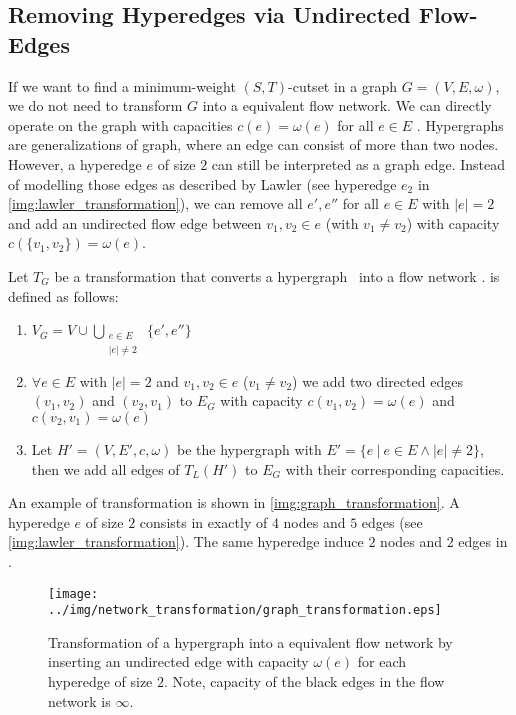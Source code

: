 \subsection{Removing Hyperedges via Undirected Flow-Edges}
\label{sec:edge_size_network}

If we want to find a minimum-weight $(S,T)$-cutset in a graph $G = (V,E,\omega)$, we do not need to transform
$G$ into a equivalent flow network. We can directly operate on the graph with capacities
$c(e) = \omega(e)$ for all $e \in E$ \cite{ford1956maximal}. Hypergraphs are generalizations of graph, where
an edge can consist of more than two nodes. However, a hyperedge $e$ of size $2$ can still be 
interpreted as a graph edge. Instead of modelling those edges as described by Lawler \cite{lawler1973}
(see hyperedge $e_2$ in \autoref{img:lawler_transformation}), we can remove all $e',e''$ for all $e \in E$
with $|e| = 2$ and add an undirected flow edge between $v_1,v_2 \in e$ (with $v_1 \neq v_2$) with
capacity $c(\{v_1,v_2\}) = \omega(e)$.

\begin{definition}
Let $T_G$ be a transformation that converts a hypergraph \HypergraphDef~into 
a flow network .  is defined as follows:
\begin{enumerate}
\item $V_G = V \cup \bigcup\limits_{\substack{e \in E \\ |e| \neq 2}}\ \{e', e''\}$
\item $\forall e \in E$ with $|e| = 2$ and $v_1,v_2 \in e$ ($v_1 \neq v_2$) we add 
      two directed edges $(v_1,v_2)$ and $(v_2,v_1)$ to $E_G$ with capacity $c(v_1,v_2) = \omega(e)$
      and $c(v_2,v_1) = \omega(e)$
\item Let $H' = (V,E',c,\omega)$ be the hypergraph with $E' = \{e\ |\ e \in E \land |e| \neq 2\}$,
      then we add all edges of $T_L(H')$ to $E_G$ with their corresponding capacities.
\end{enumerate} 
\end{definition}

An example of transformation  is shown in \autoref{img:graph_transformation}. A hyperedge
$e$ of size $2$ consists in  exactly of $4$ nodes and $5$ edges (see \autoref{img:lawler_transformation}).
The same hyperedge induce $2$ nodes and $2$ edges in . 
 
\begin{figure}
\centering
\texttt{[image: ../img/network\_transformation/graph\_transformation.eps]}
\caption{Transformation of a hypergraph into a equivalent flow network by inserting 
         an undirected edge with capacity $\omega(e)$ for each hyperedge of size $2$. 
         Note, capacity of the black edges in the flow network is $\infty$.}
\label{img:graph_transformation}
\end{figure}

